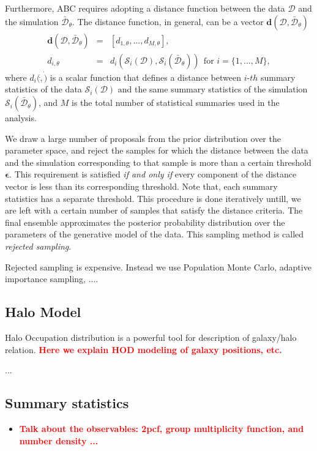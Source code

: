 \documentclass[12pt, preprint]{aastex}
\newcommand{\todo}[1]{{\bf \textcolor{red}{ #1}}}
\begin{document}
Furthermore, ABC requires adopting a distance function between the data $\mathcal{D}$ and the simulation $\bar{\mathcal{D}}_{\theta}$.
The distance function, in general, can be a vector $\bm{d}(\mathcal{D},\bar{\mathcal{D}}_{\theta})$
\begin{eqnarray}
\bm{d}(\mathcal{D},\bar{\mathcal{D}}_{\theta}) &=& [d_{1,\theta}, ... , d_{M,\theta}], \\
d_{i,\theta} &=& d_{i}(\mathcal{S}_{i}(\mathcal{D}), \mathcal{S}_{i}(\bar{\mathcal{D}}_{\theta}))  ~~\mbox{for $i=\{1,...,M\}$},
\end{eqnarray}
where $d_{i}(\dot,\dot)$ is a scalar function that defines a distance 
between $i$-$th$ summary statistics of the data $\mathcal{S}_{i}(\mathcal{D})$ and the same summary statistics of 
the simulation $\mathcal{S}_{i}(\bar{\mathcal{D}}_{\theta})$, and $M$ is the total number of statistical summaries 
used in the analysis.

We draw a large number of proposals from the prior distribution over the parameter space, 
and reject the samples for which the distance between the data and the simulation corresponding to that 
sample is more than a certain threshold $\bm{\epsilon}$. This requirement is satisfied \emph{if and only if}
every component of the distance vector is less than its corresponding threshold. Note that, each summary statistics 
has a separate threshold. This procedure is done iteratively untill, we are left with a certain number
of samples that satisfy the distance criteria. The final ensemble approximates the posterior probability distribution over the parameters of the generative model of the data. This sampling method is called \emph{rejected sampling}.

Rejected sampling is expensive. Instead we use Population Monte Carlo, adaptive importance sampling, ....

\subsection{Halo Model}

Halo Occupation distribution is a powerful tool for description of galaxy/halo relation. \todo{Here we explain HOD modeling of galaxy positions, etc.}

...

\subsection{Summary statistics}
\begin{itemize}

\item \todo{Talk about the observables: 2pcf, group multiplicity function, and number density ...}

\end{itemize}
\end{document}
